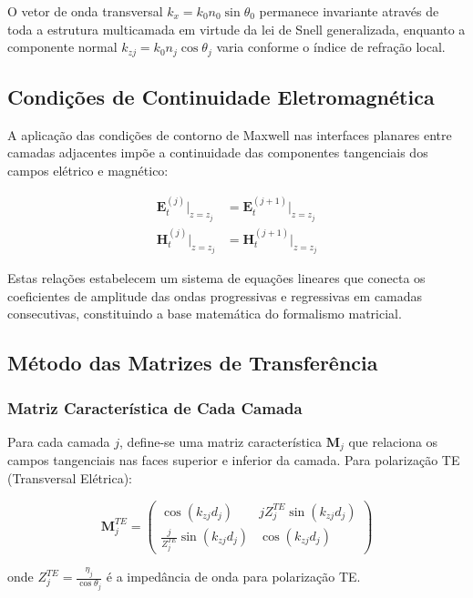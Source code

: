 \documentclass[11pt,a4paper]{article}
\begin{document}
O vetor de onda transversal $k_x = k_0 n_0 \sin\theta_0$ permanece invariante através de toda a estrutura multicamada em virtude da lei de Snell generalizada, enquanto a componente normal $k_{zj} = k_0 n_j \cos\theta_j$ varia conforme o índice de refração local.

\subsection{Condições de Continuidade Eletromagnética}

A aplicação das condições de contorno de Maxwell nas interfaces planares entre camadas adjacentes impõe a continuidade das componentes tangenciais dos campos elétrico e magnético:

\begin{align}
\mathbf{E}_{t}^{(j)}|_{z=z_j} &= \mathbf{E}_{t}^{(j+1)}|_{z=z_j} \\
\mathbf{H}_{t}^{(j)}|_{z=z_j} &= \mathbf{H}_{t}^{(j+1)}|_{z=z_j}
\end{align}

Estas relações estabelecem um sistema de equações lineares que conecta os coeficientes de amplitude das ondas progressivas e regressivas em camadas consecutivas, constituindo a base matemática do formalismo matricial.

\subsection{Método das Matrizes de Transferência}

\subsubsection{Matriz Característica de Cada Camada}

Para cada camada $j$, define-se uma matriz característica $\mathbf{M}_j$ que relaciona os campos tangenciais nas faces superior e inferior da camada. Para polarização TE (Transversal Elétrica):

\begin{equation}
\mathbf{M}_j^{TE} = \begin{pmatrix}
\cos(k_{zj}d_j) & j Z_j^{TE} \sin(k_{zj}d_j) \\
\frac{j}{Z_j^{TE}} \sin(k_{zj}d_j) & \cos(k_{zj}d_j)
\end{pmatrix}
\end{equation}

onde $Z_j^{TE} = \frac{\eta_j}{\cos\theta_j}$ é a impedância de onda para polarização TE.
\end{document}
